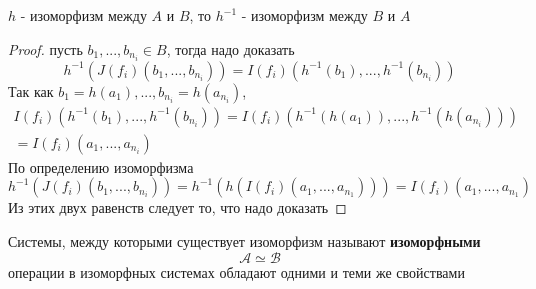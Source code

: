 \documentclass[../main/document.tex]{subfiles}
\begin{document}
\begin{thm}\label{isomorphism-inverse}
$h$ - изоморфизм между $A$ и $B$, то $h^{-1}$ - изоморфизм между $B$ и $A$
\begin{proof} пусть $b_1,...,b_{n_i}\in B$, тогда надо доказать
$$h^{-1}(J(f_i)(b_1,...,b_{n_i}))=I(f_i)(h^{-1}(b_1),...,h^{-1}(b_{n_i}))$$
Так как $b_1=h(a_1),...,b_{n_i}=h(a_{n_i})$,
\begin{multline*}
I(f_i)(h^{-1}(b_1),...,h^{-1}(b_{n_i}))=I(f_i)(h^{-1}(h(a_1)),...,h^{-1}(h(a_{n_i})))\\
=I(f_i)(a_1,...,a_{n_i})
\end{multline*}
$$$$
По определению изоморфизма
$$h^{-1}(J(f_i)(b_1,...,b_{n_i}))=h^{-1}(h(I(f_i)(a_1,...,a_{n_1})))=I(f_i)(a_1,...,a_{n_1})$$
Из этих двух равенств следует то, что надо доказать
\end{proof}
\end{thm}

\begin{dfn}
Системы, между которыми существует изоморфизм называют \textbf{изоморфными}
$$\mathcal{A}\simeq\mathcal{B}$$
операции в изоморфных системах обладают одними и теми же свойствами
\end{dfn}
\end{document}
